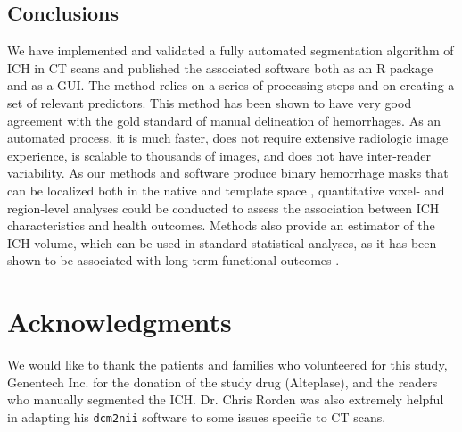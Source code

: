 \documentclass{elsarticle_nonatbib}\usepackage[]{graphicx}\usepackage[]{color}
\newcommand{\code}[1]{\texttt{#1}}
\begin{document}


\subsection{Conclusions}
We have implemented and validated a fully automated segmentation algorithm of ICH in CT scans and published the associated software both as an R package and as a GUI.  The method relies on a series of processing steps and on creating a set of relevant predictors.  This method has been shown to have very good agreement with the gold standard of manual delineation of hemorrhages.  As an automated process, it is much faster, does not require extensive radiologic image experience, is scalable to thousands of images, and does not have inter-reader variability.  As our methods and software produce binary hemorrhage masks that can be localized both in the native and template space \citep{muschelli2015quantitative}, quantitative voxel- and region-level analyses could be conducted to assess the association between ICH characteristics and health outcomes.  Methods also provide an estimator of the ICH volume, which can be used in standard statistical analyses, as it has been shown to be associated with long-term functional outcomes \citep{broderick_volume_1993, jordan2009intracerebral, tuhrim_volume_1999}.  


\section*{Acknowledgments}
We would like to thank the patients and families who volunteered for this study, Genentech Inc. for the donation of the study drug (Alteplase), and the readers who manually segmented the ICH.  Dr. Chris Rorden was also extremely helpful in adapting his \code{dcm2nii} software to some issues specific to CT scans.
\end{document}
